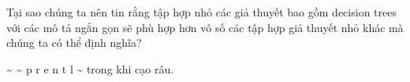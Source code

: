 Tại sao chúng ta nên tin rằng tập hợp nhỏ các giả thuyết bao gồm decision trees với các mô tả ngắn gọn sẽ phù hợp hơn vô số các tập hợp giả thuyết nhỏ khác mà chúng ta có thể định nghĩa?

\textasciitilde{} \textasciitilde{} p r e n t l \textasciitilde{} trong khi cạo râu.

